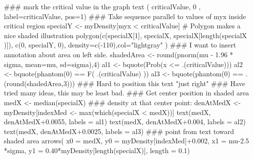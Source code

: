\begin{Schunk}
\begin{Sinput}
 ### mark the critical value in the graph
 text ( criticalValue, 0 ,
       label=criticalValue, pos=1)
 ### Take sequence parallel to values of myx inside critical region
 specialY <- myDensity[myx < criticalValue]
 #  Polygon makes a nice shaded illustration
 polygon(c(specialX[1], specialX, specialX[length(specialX )]), c(0, specialY, 0), density=c(-110),col="lightgray" )
 ### I want to insert annotation about area on left side.
 shadedArea <- round(pnorm(mu - 1.96 * sigma, mean=mu, sd=sigma),4)
 al1 <- bquote(Prob(x <= .(criticalValue)))
 al2 <- bquote(phantom(0) == F( .(criticalValue) ))
 al3 <- bquote(phantom(0) == .(round(shadedArea,3)))
 ### Hard to position this text "just right"
 ### Have tried many ideas, this may be least bad.
 ### Get center position in shaded area
 medX <- median(specialX)
 ### density at that center point:
 denAtMedX <- myDensity[indexMed <- max(which(specialX < medX))]
 text(medX, denAtMedX+0.0055, labels = al1)
 text(medX, denAtMedX+0.004, labels = al2)
 text(medX, denAtMedX+0.0025, labels = al3)
 ### point from text toward shaded area
 arrows( x0 = medX, y0 = myDensity[indexMed]+0.002,
        x1 = mu-2.5 *sigma, y1 = 0.40*myDensity[length(specialX)], length = 0.1)
\end{Sinput}
\end{Schunk}
